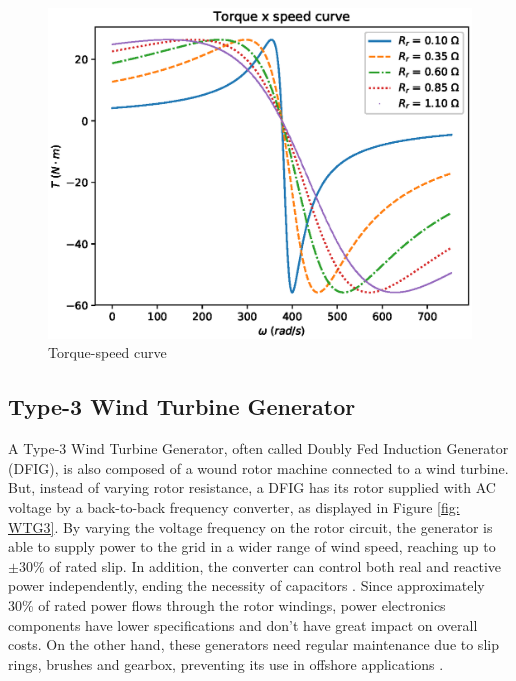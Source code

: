 \begin{figure}[h]
	\caption{Torque-speed curve}
	\begin{center}
		\includegraphics[scale=.7]{Images/Tw_curve.eps}
	\end{center}
	\label{fig: Tw}
\end{figure}

\subsection{Type-3 Wind Turbine Generator}

A Type-3 Wind Turbine Generator, often called Doubly Fed Induction Generator (DFIG), is also composed of a wound rotor machine connected to a wind turbine. But, instead of varying rotor resistance, a DFIG has its rotor supplied with AC voltage by a back-to-back frequency converter, as displayed in Figure \ref{fig: WTG3}. By varying the voltage frequency on the rotor circuit, the generator is able to supply power to the grid in a wider range of wind speed, reaching up to $\pm 30\%$ of rated slip. In addition, the converter can control both real and reactive power independently, ending the necessity of capacitors \cite{Muljadi2010}. Since approximately 30\% of rated power flows through the rotor windings, power electronics components have lower specifications and don't have great impact on overall costs. On the other hand, these generators need regular maintenance due to slip rings, brushes and gearbox, preventing its use in offshore applications \cite{Yaramasu2015}.


